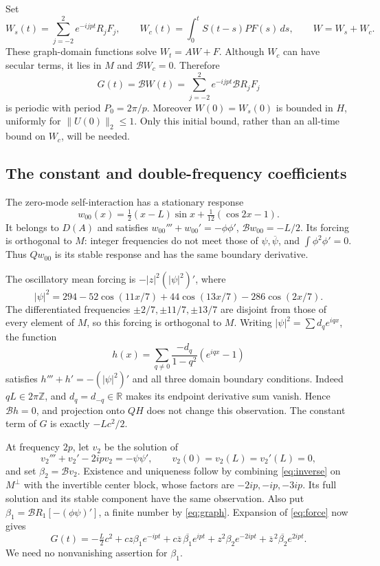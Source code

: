 \documentclass[11pt]{article}
\theoremstyle{remark}\newtheorem{remark}[theorem]{Remark}
\numberwithin{equation}{section}
\begin{document}
Set
\begin{equation}\label{eq:response}
 W_s(t)=\sum_{j=-2}^2e^{-ijpt}R_jF_j,\qquad
 W_c(t)=\int_0^tS(t-s)PF(s)\,ds,\qquad W=W_s+W_c.
\end{equation}
These graph-domain functions solve $W_t=AW+F$.
Although $W_c$ can have secular terms, it lies in $M$ and
$\mathcal BW_c=0$. Therefore
\begin{equation}\label{eq:G}
 G(t)=\mathcal BW(t)=\sum_{j=-2}^2e^{-ijpt}\mathcal BR_jF_j
\end{equation}
is periodic with period $P_0=2\pi/p$.
Moreover $W(0)=W_s(0)$ is bounded in $H$, uniformly for $\|U(0)\|_2\le1$.
Only this initial bound, rather than an all-time bound on $W_c$, will be needed.

\subsection{The constant and double-frequency coefficients}
The zero-mode self-interaction has a stationary response
\begin{equation}\label{eq:w00}
 w_{00}(x)=\tfrac12(x-L)\sin x+\tfrac1{12}(\cos2x-1).
\end{equation}
It belongs to $D(A)$ and satisfies
$w_{00}'''+w_{00}'=-\phi\phi'$, $\mathcal Bw_{00}=-L/2$.
Its forcing is orthogonal to $M$: integer frequencies do not meet those of
$\psi,\overline\psi$, and $\int\phi^2\phi'=0$.
Thus $Qw_{00}$ is its stable response and has the same boundary derivative.

The oscillatory mean forcing is $-|z|^2(|\psi|^2)'$, where
\begin{equation}\label{eq:psi-square}
 |\psi|^2=294-52\cos(11x/7)+44\cos(13x/7)-286\cos(2x/7).
\end{equation}
The differentiated frequencies $\pm2/7,\pm11/7,\pm13/7$ are disjoint from
those of every element of $M$, so this forcing is orthogonal to $M$.
Writing $|\psi|^2=\sum d_qe^{iqx}$, the function
\[
 h(x)=\sum_{q\ne0}\frac{-d_q}{1-q^2}(e^{iqx}-1)
\]
satisfies $h'''+h'=-(|\psi|^2)'$ and all three domain boundary conditions.
Indeed $qL\in2\pi\mathbb Z$, and $d_q=d_{-q}\in\mathbb R$ makes its endpoint
derivative sum vanish. Hence $\mathcal Bh=0$, and projection onto $QH$
does not change this observation. The constant term of $G$ is exactly $-Lc^2/2$.

At frequency $2p$, let $v_2$ be the solution of
\begin{equation}\label{eq:v2}
 v_2'''+v_2'-2ip v_2=-\psi\psi',\qquad
 v_2(0)=v_2(L)=v_2'(L)=0,
\end{equation}
and set $\beta_2=\mathcal Bv_2$.
Existence and uniqueness follow by combining \eqref{eq:inverse} on $M^\perp$
with the invertible center block, whose factors are $-2ip,-ip,-3ip$.
Its full solution and its stable component have the same observation.
Also put $\beta_1=\mathcal BR_1[-(\phi\psi)']$, a finite number by
\eqref{eq:graph}. Expansion of \eqref{eq:force} now gives
\begin{equation}\label{eq:G-coefficients}
 G(t)=-\tfrac L2c^2+cz\beta_1e^{-ipt}
 +c\overline z\,\overline{\beta_1}e^{ipt}
 +z^2\beta_2e^{-2ipt}+\overline z^{\,2}\overline{\beta_2}e^{2ipt}.
\end{equation}
We need no nonvanishing assertion for $\beta_1$.
\end{document}
